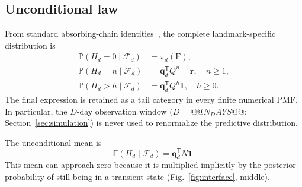 \documentclass{ieeeaccess}
\newcommand{\F}{\mathrm{F}}
\newcommand{\trans}{\mathsf T}
\newcommand{\vect}[1]{\bm{#1}}
\newcommand{\Prb}{\mathbb P}
\newcommand{\E}{\mathbb E}
\begin{document}
\subsection{Unconditional law}
From standard absorbing-chain identities~\cite{kemeny}, the complete landmark-specific distribution is
\begin{align}
\Prb(H_d=0\mid\mathcal F_d)&=\pi_d(\F),\label{eq:p0}\\
\Prb(H_d=n\mid\mathcal F_d)&=\vect{q}_d^{\trans}Q^{n-1}\vect{r},
\quad n\ge1,\label{eq:pn}\\
\Prb(H_d>h\mid\mathcal F_d)&=\vect{q}_d^{\trans}Q^h\vect{1},
\quad h\ge0.\label{eq:tail}
\end{align}
The final expression is retained as a tail category in every finite numerical PMF. In particular, the $D$-day observation window ($D=@@N_DAYS@@$; Section~\ref{sec:simulation}) is never used to renormalize the predictive distribution.

The unconditional mean is
\begin{equation}
\E(H_d\mid\mathcal F_d)=\vect{q}_d^{\trans}N\vect{1}.
\label{eq:uncondmean}
\end{equation}
This mean can approach zero because it is multiplied implicitly by the posterior probability of still being in a transient state (Fig.~\ref{fig:interface}, middle).
\end{document}
